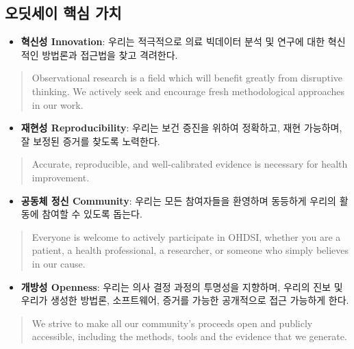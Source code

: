 \documentclass[]{book}
\providecommand{\tightlist}{%
  \setlength{\itemsep}{0pt}\setlength{\parskip}{0pt}}
\begin{document}
\hypertarget{section-2}{%
\subsection{오딧세이 핵심 가치}\label{section-2}}

\begin{itemize}
\tightlist
\item
  \textbf{혁신성 Innovation}: 우리는 적극적으로 의료 빅데이터 분석 및 연구에 대한 혁신적인 방법론과 접근법을 찾고 격려한다.
\end{itemize}

\begin{quote}
Observational research is a field which will benefit greatly from disruptive thinking. We actively seek and encourage fresh methodological approaches in our work.
\end{quote}

\begin{itemize}
\tightlist
\item
  \textbf{재현성 Reproducibility}: 우리는 보건 증진을 위하여 정확하고, 재현 가능하며, 잘 보정된 증거를 찾도록 노력한다.
\end{itemize}

\begin{quote}
Accurate, reproducible, and well-calibrated evidence is necessary for health improvement.
\end{quote}

\begin{itemize}
\tightlist
\item
  \textbf{공동체 정신 Community}: 우리는 모든 참여자들을 환영하며 동등하게 우리의 활동에 참여할 수 있도록 돕는다.
\end{itemize}

\begin{quote}
Everyone is welcome to actively participate in OHDSI, whether you are a patient, a health professional, a researcher, or someone who simply believes in our cause.
\end{quote}

\begin{itemize}
\tightlist
\item
  \textbf{개방성 Openness}: 우리는 의사 결정 과정의 투명성을 지향하며, 우리의 진보 및 우리가 생성한 방법론, 소프트웨어, 증거를 가능한 공개적으로 접근 가능하게 한다.
\end{itemize}

\begin{quote}
We strive to make all our community's proceeds open and publicly accessible, including the methods, tools and the evidence that we generate.
\end{quote}
\end{document}
